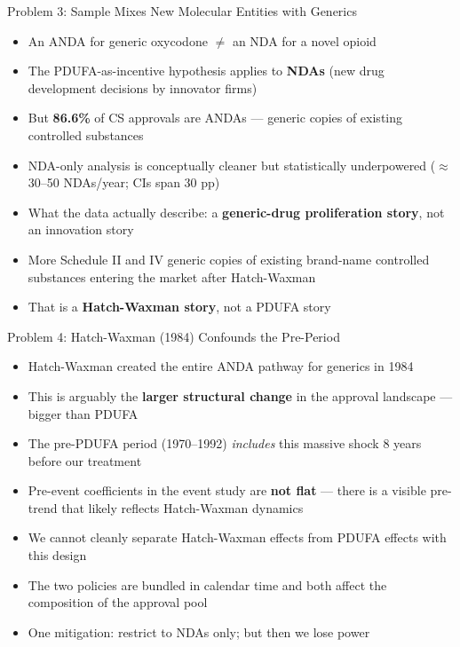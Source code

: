 \documentclass[10pt]{beamer}
\begin{document}
\begin{frame}[t]{Problem 3: Sample Mixes New Molecular Entities with Generics}
  \begin{itemize}
    \item An ANDA for generic oxycodone $\ne$ an NDA for a novel opioid
    \item The PDUFA-as-incentive hypothesis applies to \textbf{NDAs}
          (new drug development decisions by innovator firms)
    \item But \textbf{86.6\%} of CS approvals are ANDAs --- generic copies
          of existing controlled substances
    \item NDA-only analysis is conceptually cleaner but statistically
          underpowered ($\approx$30--50 NDAs/year; CIs span 30 pp)
    \item \alert{What the data actually describe:} a
          \textbf{generic-drug proliferation story}, not an innovation story
    \item More Schedule II and IV generic copies of existing brand-name
          controlled substances entering the market after Hatch-Waxman
    \item That is a \textbf{Hatch-Waxman story}, not a PDUFA story
  \end{itemize}
\end{frame}

\begin{frame}[t]{Problem 4: Hatch-Waxman (1984) Confounds the Pre-Period}
  \begin{itemize}
    \item Hatch-Waxman created the entire ANDA pathway for generics in 1984
    \item This is arguably the \textbf{larger structural change} in the
          approval landscape --- bigger than PDUFA
    \item The pre-PDUFA period (1970--1992) \textit{includes} this massive
          shock 8 years before our treatment
    \item Pre-event coefficients in the event study are \textbf{not flat} ---
          there is a visible pre-trend that likely reflects Hatch-Waxman
          dynamics
    \item We cannot cleanly separate Hatch-Waxman effects from PDUFA effects
          with this design
    \item \alert{The two policies are bundled in calendar time} and both affect
          the composition of the approval pool
    \item One mitigation: restrict to NDAs only; but then we lose power
  \end{itemize}
\end{frame}
\end{document}
